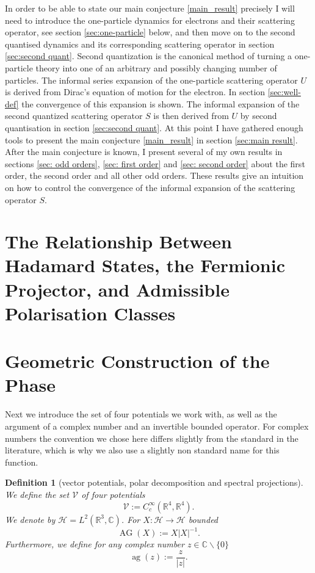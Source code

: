 \documentclass[b5paper,draft,openbib,12pt]{memoir}
\newtheorem{Def}{Definition}
\DeclareMathOperator{\ag}{ag}
\DeclareMathOperator{\AG}{AG}
\begin{document}
In order to be able to state our main conjecture \eqref{main_result} precisely
I will need to introduce the one-particle dynamics for electrons and their
scattering operator, see section \ref{sec:one-particle} below, and then move on
to the second quantised dynamics and its corresponding scattering operator  in
section \ref{sec:second quant}. Second quantization is the canonical
method of turning a one-particle theory into one of an arbitrary and
possibly changing number of particles. The informal
series expansion of the one-particle scattering operator \(U\) is derived 
from Dirac's equation of motion for the electron. In section
 \ref{sec:well-def} the convergence of this
expansion is shown. The informal expansion of the second quantized
scattering operator $S$ is then derived from $U$ by second quantisation in
section \ref{sec:second quant}. At this point I have gathered enough tools to present the main conjecture \ref{main_result} in section \ref{sec:main result}. 
After the main conjecture is known, I present several of my own results in sections \ref{sec: odd orders}, \ref{sec: first order} and \ref{sec: second order} about the first order, the second order and all other odd orders. 
These results give an intuition on how to control the convergence of the informal expansion of the scattering operator \(S\).

\section{The Relationship Between Hadamard States, the Fermionic Projector, and Admissible Polarisation Classes}


\section{Geometric Construction of the Phase}
Next we introduce the set of four potentials we work with, as well as the argument of a complex number and an 
invertible bounded operator. For complex numbers the convention we chose here differs slightly from the standard in the literature,
which is why we also use a slightly non standard name for this function.
\begin{Def}[vector potentials, polar decomposition and spectral projections]
We define the set \(\mathcal{V}\) of four potentials
\begin{equation}
\mathcal{V}:= C_c^\infty(\mathbb{R}^4,\mathbb{R}^4).
\end{equation}
We denote by \(\mathcal{H}=L^2(\mathbb{R}^3,\mathbb{C})\).
For \(X:\mathcal{H}\rightarrow \mathcal{H}\) bounded
\begin{equation}
\AG(X):=X |X|^{-1}.
\end{equation}
Furthermore, we define for any complex number \(z\in \mathbb{C}\backslash \{0\}\)
\begin{equation}
\ag(z):=\frac{z}{|z|} .
\end{equation}
\end{Def}
\end{document}
